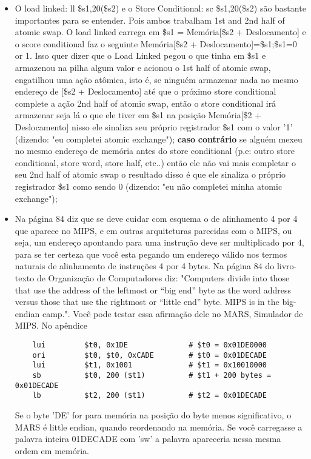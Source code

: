 \documentclass{article}
\begin{document}
\begin{itemize}
\item O load linked: ll \$s1,20(\$s2) e o Store Conditional: sc \$s1,20(\$s2)
são bastante importantes para se entender. Pois ambos trabalham 1st and 2nd half
of atomic swap. O load linked carrega em \$s1 = Memória[\$s2 + Deslocamento] e o
score conditional faz o seguinte Memória[\$s2 + Deslocamento]=\$s1;\$s1={0 or
1}. Isso quer dizer que o Load Linked pegou o que tinha em \$s1 e armazenou na
pilha algum valor e acionou o 1st half of atomic swap, engatilhou uma ação
atômica, isto é, se ninguém armazenar nada no mesmo endereço de [\$s2 +
Deslocamento] até que o próximo store conditional complete a ação 2nd half of
atomic swap, então o store conditional irá armazenar seja lá o que ele tiver em
\$s1 na posição Memória[\$2 + Deslocamento] nisso ele sinaliza seu próprio
registrador \$s1 com o valor '1' (dizendo: "eu completei atomic exchange");
\textbf{caso} \textbf{contrário} se alguém mexeu no mesmo endereço de memória
antes do store conditional (p.e: outro store conditional, store word, store
half, etc..) então ele não vai mais completar o seu 2nd half of atomic swap o
resultado disso é que ele sinaliza o próprio registrador \$s1 como sendo 0
(dizendo: "eu não completei minha atomic exchange");

\item Na página 84 diz que se deve cuidar com esquema o de alinhamento 4 por 4
que aparece no MIPS, e em outras arquiteturas parecidas com o MIPS, ou seja, um
endereço apontando para uma instrução deve ser multiplicado por 4, para se ter
certeza que você esta pegando um endereço válido nos termos naturais de
alinhamento de instruções 4 por 4 bytes. Na página 84 do livro-texto de
Organização de Computadores diz: "Computers divide into those that use the
address of the leftmost or “big end” byte as the word address versus those that
use the rightmost or “little end” byte. MIPS is in the big-endian camp.". Você
pode testar essa afirmação dele no MARS, Simulador de MIPS. No apêndice
  \begin{verbatim}
    lui         $t0, 0x1DE              # $t0 = 0x01DE0000
    ori         $t0, $t0, 0xCADE        # $t0 = 0x01DECADE
    lui         $t1, 0x1001             # $t1 = 0x10010000
    sb          $t0, 200 ($t1)          # $t1 + 200 bytes = 0x01DECADE
    lb          $t2, 200 ($t1)          # $t2 = 0x01DECADE
  \end{verbatim}
Se o byte 'DE' for para memória na posição do byte menos significativo, o MARS
é little endian, quando reordenando na memória. Se você carregasse a palavra
inteira 01DECADE com 'sw' a palavra apareceria nessa mesma ordem em memória.


\end{itemize}
\end{document}
